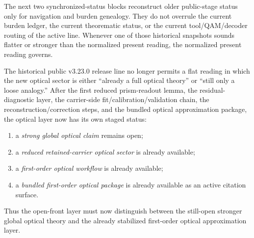 \begin{remark}
The next two synchronized-status blocks reconstruct older public-stage status only for navigation and burden genealogy. They do not overrule the current burden ledger, the current theorematic status, or the current tool/QAM/decoder routing of the active line. Whenever one of those historical snapshots sounds flatter or stronger than the normalized present reading, the normalized present reading governs.
\end{remark}

\begin{remark}
\label{rem:v323-synchronized-status-reading-for-the-optical-approximation-layer}
The historical public v3.23.0 release line no longer permits a flat reading in which the new optical sector is either ``already a full optical theory'' or ``still only a loose analogy.'' After the first reduced prism-readout lemma, the residual-diagnostic layer, the carrier-side fit/calibration/validation chain, the reconstruction/correction steps, and the bundled optical approximation package, the optical layer now has its own staged status:
\begin{enumerate}[leftmargin=2em,label=(\roman*)]
  \item a \emph{strong global optical claim} remains open;
  \item a \emph{reduced retained-carrier optical sector} is already available;
  \item a \emph{first-order optical workflow} is already available;
  \item a \emph{bundled first-order optical package} is already available as an active citation surface.
\end{enumerate}
Thus the open-front layer must now distinguish between the still-open stronger global optical theory and the already stabilized first-order optical approximation layer.
\end{remark}

